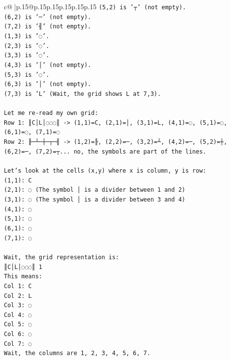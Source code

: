 \documentclass{article}
\begin{document}
{\begin{supertabular}{c@{$\;$}|p{.15\linewidth}@{}p{.15\linewidth}p{.15\linewidth}p{.15\linewidth}p{.15\linewidth}p{.15\linewidth}}
{{{\texttt{(5,2) is '┬' (not empty).} \\
\texttt{(6,2) is '─' (not empty).} \\
\texttt{(7,2) is '╢' (not empty).} \\
\texttt{(1,3) is '◌'.} \\
\texttt{(2,3) is '◌'.} \\
\texttt{(3,3) is '◌'.} \\
\texttt{(4,3) is '│' (not empty).} \\
\texttt{(5,3) is '◌'.} \\
\texttt{(6,3) is '│' (not empty).} \\
\texttt{(7,3) is 'L' (Wait, the grid shows L at 7,3).} \\
\\ 
\texttt{Let me re{-}read my own grid:} \\
\texttt{Row 1: ║C│L│◌◌◌║ {-}> (1,1)=C, (2,1)=│, (3,1)=L, (4,1)=◌, (5,1)=◌, (6,1)=◌, (7,1)=◌} \\
\texttt{Row 2: ╟─┴─┼─┬─╢ {-}> (1,2)=╟, (2,2)=─, (3,2)=┴, (4,2)=─, (5,2)=┼, (6,2)=─, (7,2)=┬... no, the symbols are part of the lines.} \\
\\ 
\texttt{Let's look at the cells (x,y) where x is column, y is row:} \\
\texttt{(1,1): C} \\
\texttt{(2,1): ◌ (The symbol │ is a divider between 1 and 2)} \\
\texttt{(3,1): ◌ (The symbol │ is a divider between 3 and 4)} \\
\texttt{(4,1): ◌} \\
\texttt{(5,1): ◌} \\
\texttt{(6,1): ◌} \\
\texttt{(7,1): ◌} \\
\\ 
\texttt{Wait, the grid representation is:} \\
\texttt{║C│L│◌◌◌║ 1} \\
\texttt{This means:} \\
\texttt{Col 1: C} \\
\texttt{Col 2: L} \\
\texttt{Col 3: ◌} \\
\texttt{Col 4: ◌} \\
\texttt{Col 5: ◌} \\
\texttt{Col 6: ◌} \\
\texttt{Col 7: ◌} \\
\texttt{Wait, the columns are 1, 2, 3, 4, 5, 6, 7.} \\
}}}
\end{supertabular}}
\end{document}
